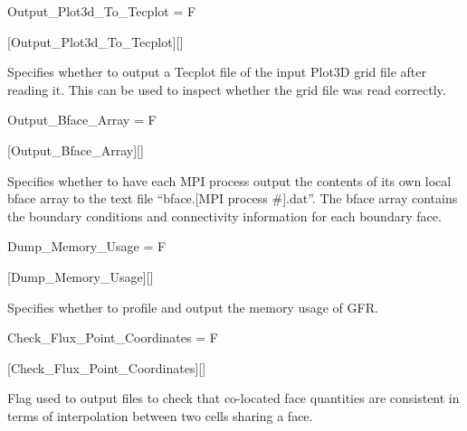 \begin{nmldescitem}
Output_Plot3d_To_Tecplot = F
\end{nmldescitem}
[Output\_Plot3d\_To\_Tecplot][]

\begin{nmldescbody}
Specifies whether to output a Tecplot file of the input Plot3D grid file
after reading it.
%
This can be used to inspect whether the grid file was read correctly.
\end{nmldescbody}


\begin{nmldescitem}
Output_Bface_Array = F
\end{nmldescitem}
[Output\_Bface\_Array][]

\begin{nmldescbody}
Specifies whether to have each MPI process output the contents of its
own local bface array to the text file ``bface.[MPI process \#].dat''.
%
The bface array contains the boundary conditions and connectivity
information for each boundary face.
\end{nmldescbody}


\begin{nmldescitem}
Dump_Memory_Usage = F
\end{nmldescitem}
[Dump\_Memory\_Usage][]

\begin{nmldescbody}
Specifies whether to profile and output the memory usage of GFR.
\end{nmldescbody}


\begin{nmldescitem}
Check_Flux_Point_Coordinates = F
\end{nmldescitem}
[Check\_Flux\_Point\_Coordinates][]

\begin{nmldescbody}
Flag used to output files to check that co-located face quantities
are consistent in terms of interpolation between two cells sharing a face.
\end{nmldescbody}

